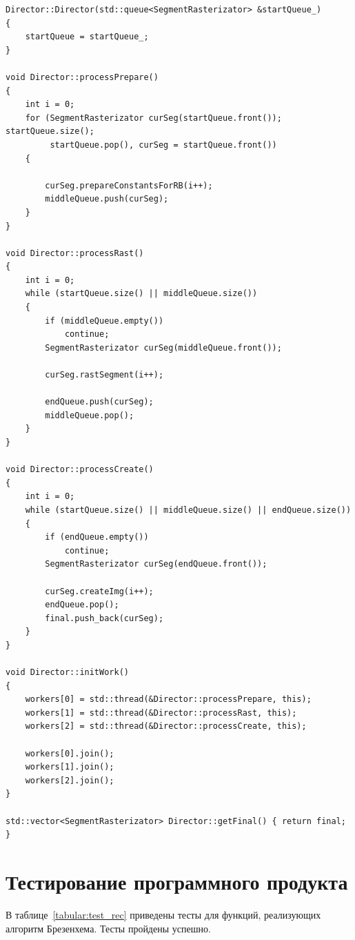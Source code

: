 \documentclass[12pt]{report}
\begin{document}
\begin{lstlisting}[caption=Менеджер потоков,
label={list:director}]
Director::Director(std::queue<SegmentRasterizator> &startQueue_)
{
    startQueue = startQueue_;
}

void Director::processPrepare()
{
    int i = 0;
    for (SegmentRasterizator curSeg(startQueue.front()); startQueue.size();
         startQueue.pop(), curSeg = startQueue.front())
    {

        curSeg.prepareConstantsForRB(i++);
        middleQueue.push(curSeg);
    }
}

void Director::processRast()
{
    int i = 0;
    while (startQueue.size() || middleQueue.size())
    {
        if (middleQueue.empty())
            continue;
        SegmentRasterizator curSeg(middleQueue.front());

        curSeg.rastSegment(i++);

		endQueue.push(curSeg);
        middleQueue.pop();
    }
}

void Director::processCreate()
{
    int i = 0;
    while (startQueue.size() || middleQueue.size() || endQueue.size())
    {
        if (endQueue.empty())
            continue;
        SegmentRasterizator curSeg(endQueue.front());

        curSeg.createImg(i++);
        endQueue.pop();
        final.push_back(curSeg);
    }
}

void Director::initWork()
{
    workers[0] = std::thread(&Director::processPrepare, this);
    workers[1] = std::thread(&Director::processRast, this);
    workers[2] = std::thread(&Director::processCreate, this);

    workers[0].join();
    workers[1].join();
    workers[2].join();
}

std::vector<SegmentRasterizator> Director::getFinal() { return final; }
\end{lstlisting}

\section{Тестирование программного продукта}
В таблице~\ref{tabular:test_rec} приведены тесты для функций, реализующих алгоритм Брезенхема. Тесты пройдены успешно.
\end{document}
